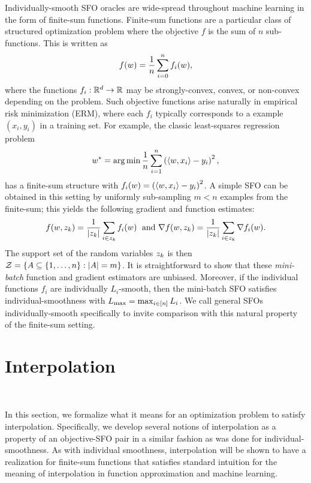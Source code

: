 Individually-smooth SFO oracles are wide-spread throughout machine learning in the form of finite-sum functions. 
Finite-sum functions are a particular class of structured optimization problem where the objective \( f \) is the sum of \( n \) sub-functions. 
This is written as
\begin{align*}
    f(w) = \frac{1}{n} \sum_{i = 0}^n f_i(w), 
\end{align*}
where the functions \( f_i : \mathbb{R}^d \rightarrow \mathbb{R} \) may be strongly-convex, convex, or non-convex depending on the problem.
Such objective functions arise naturally in empirical risk minimization (ERM), where each \( f_i \) typically corresponds to a example \( (x_i, y_i) \) in a training set.
For example, the classic least-squares regression problem 
\[ w^* = \mathop{\rm arg\,min} \frac{1}{n} \sum_{i=1}^n \left(\left\langle w, x_i\right\rangle - y_i\right)^2, \]
has a finite-sum structure with \( f_i(w) =  \left(\left\langle w, x_i\right\rangle - y_i\right)^2\).
A simple SFO can be obtained in this setting by uniformly sub-sampling \( m < n \) examples from the finite-sum; this yields the following gradient and function estimates:
\[ f(w, z_{k}) = \frac{1}{|z_{k}|} \sum_{i \in z_{k}} f_i(w) \; \text{ and } \nabla f(w, z_{k}) = \frac{1}{|z_{k}|} \sum_{i \in z_{k}} \nabla f_i(w). \]
The support set of the random variables \( z_{k} \) is then \( \mathcal{Z} = \left\{ A \subseteq \left\{1, \dots, n\right\} : |A| = m \right\} \).
It is straightforward to show that these \emph{mini-batch} function and gradient estimators are unbiased.
Moreover, if the individual functions \( f_i \) are individually \( L_i \)-smooth, then the mini-batch SFO satisfies individual-smoothness with \( L_{\text{max}} = \max_{i\in [n]} L_i \).
We call general SFOs \oracle{} individually-smooth specifically to invite comparison with this natural property of the finite-sum setting. 


\section{Interpolation}~\label{sec:interpolation}

In this section, we formalize what it means for an optimization problem to satisfy interpolation.
Specifically, we develop several notions of interpolation as a property of an objective-SFO pair in a similar fashion as was done for individual-smoothness.
As with individual smoothness, interpolation will be shown to have a realization for finite-sum functions that satisfies standard intuition for the meaning of interpolation in function approximation and machine learning. 

